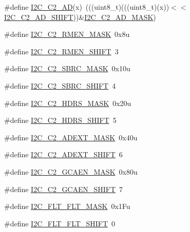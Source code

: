 \begin{DoxyCompactItemize}
\#define \hyperlink{group___i2_c___register___masks_gaa19edf20551c0d4dc70b840c2c5b7e24}{I2\+C\+\_\+\+C2\+\_\+\+AD}(x)~(((uint8\+\_\+t)(((uint8\+\_\+t)(x))$<$$<$\hyperlink{group___i2_c___register___masks_gab875d484e12dc6ae427c2063430d1362}{I2\+C\+\_\+\+C2\+\_\+\+A\+D\+\_\+\+S\+H\+I\+FT}))\&\hyperlink{group___i2_c___register___masks_ga6c5f8db3bac4c51de9446448a8ad9072}{I2\+C\+\_\+\+C2\+\_\+\+A\+D\+\_\+\+M\+A\+SK})
\item 
\#define \hyperlink{group___i2_c___register___masks_ga70911373d5619a4d8376777446085856}{I2\+C\+\_\+\+C2\+\_\+\+R\+M\+E\+N\+\_\+\+M\+A\+SK}~0x8u
\item 
\#define \hyperlink{group___i2_c___register___masks_ga802a10e2d279895ec0230b4701b1a4bf}{I2\+C\+\_\+\+C2\+\_\+\+R\+M\+E\+N\+\_\+\+S\+H\+I\+FT}~3
\item 
\#define \hyperlink{group___i2_c___register___masks_gad5acb46182264a92f1f7ca818146d44e}{I2\+C\+\_\+\+C2\+\_\+\+S\+B\+R\+C\+\_\+\+M\+A\+SK}~0x10u
\item 
\#define \hyperlink{group___i2_c___register___masks_ga620079dc18e7ce504b6092503a10d2ae}{I2\+C\+\_\+\+C2\+\_\+\+S\+B\+R\+C\+\_\+\+S\+H\+I\+FT}~4
\item 
\#define \hyperlink{group___i2_c___register___masks_gaa36c867ead9ecee381f4a6f1f75ccc70}{I2\+C\+\_\+\+C2\+\_\+\+H\+D\+R\+S\+\_\+\+M\+A\+SK}~0x20u
\item 
\#define \hyperlink{group___i2_c___register___masks_ga0d2a8c7a7fb308cf052fc122c1af92c5}{I2\+C\+\_\+\+C2\+\_\+\+H\+D\+R\+S\+\_\+\+S\+H\+I\+FT}~5
\item 
\#define \hyperlink{group___i2_c___register___masks_ga331301810a6ac65f43e66b78bbde4c91}{I2\+C\+\_\+\+C2\+\_\+\+A\+D\+E\+X\+T\+\_\+\+M\+A\+SK}~0x40u
\item 
\#define \hyperlink{group___i2_c___register___masks_ga266bbd66a022e8b78eb5501d9d927164}{I2\+C\+\_\+\+C2\+\_\+\+A\+D\+E\+X\+T\+\_\+\+S\+H\+I\+FT}~6
\item 
\#define \hyperlink{group___i2_c___register___masks_gabe69d0985ed23c71c071a6ebd93f65df}{I2\+C\+\_\+\+C2\+\_\+\+G\+C\+A\+E\+N\+\_\+\+M\+A\+SK}~0x80u
\item 
\#define \hyperlink{group___i2_c___register___masks_ga2621c8acf26335441da9ced92ca4d29f}{I2\+C\+\_\+\+C2\+\_\+\+G\+C\+A\+E\+N\+\_\+\+S\+H\+I\+FT}~7
\item 
\#define \hyperlink{group___i2_c___register___masks_ga61b9691f2f522b624d0ace6268c972df}{I2\+C\+\_\+\+F\+L\+T\+\_\+\+F\+L\+T\+\_\+\+M\+A\+SK}~0x1\+Fu
\item 
\#define \hyperlink{group___i2_c___register___masks_ga87c3021777b04e02f3c0481cdbde30e5}{I2\+C\+\_\+\+F\+L\+T\+\_\+\+F\+L\+T\+\_\+\+S\+H\+I\+FT}~0
$$
\end{DoxyCompactItemize}
